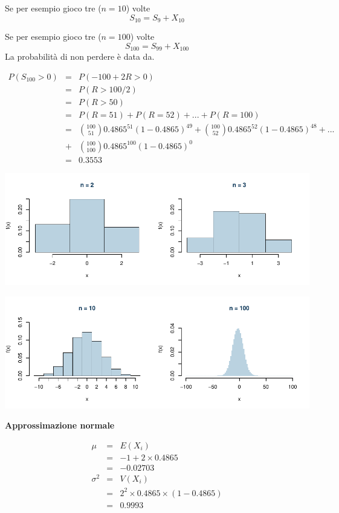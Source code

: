 \documentclass[
  11pt,
]{book}
\theoremstyle{mytheoremstyle}
\theoremstyle{mydefstyle}
\begin{document}
Se per esempio gioco tre (\(n=10\)) volte
\[
S_{10} = S_9+X_{10}
\]

Se per esempio gioco tre (\(n=100\)) volte
\[
S_{100} = S_{99}+X_{100}
\]
La probabilità di non perdere è data da.

\begin{eqnarray*}
P(S_{100}>0)&=& P(-100+2R>0)\\
 &=& P(R>100/2)\\
&=&P(R>50)\\
&=&P(R=51)+P(R=52)+...+P(R=100)\\
&=&\binom{100}{51}0.4865^{51}(1-0.4865)^{49}+\binom{100}{52}0.4865^{52}(1-0.4865)^{48}+...\\
&+& \binom{100}{100}0.4865^{100}(1-0.4865)^{0}\\
&=& 0.3553
\end{eqnarray*}

\begin{center}\includegraphics{Appunti_di_Statistica_2025_files/figure-latex/08-tlc-13-1} \end{center}

\begin{center}\includegraphics{Appunti_di_Statistica_2025_files/figure-latex/08-tlc-14-1} \end{center}

\textbf{Approssimazione normale}

\begin{eqnarray*}
\mu &=& E(X_i)\\
&=& -1+2\times 0.4865\\
&=&-0.02703\\
\sigma^2 &=& V(X_i) \\
&=& 2^2\times 0.4865\times(1-0.4865)\\
&=& 0.9993
\end{eqnarray*}
\end{document}
